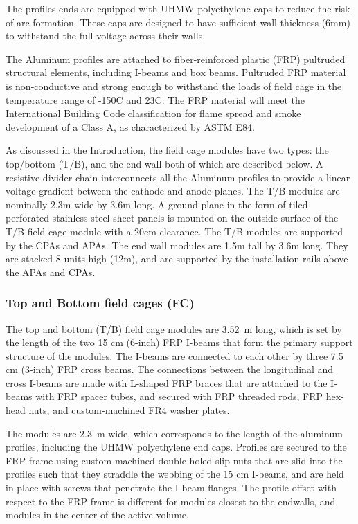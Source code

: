 The profiles ends are equipped with UHMW polyethylene caps to reduce the risk of arc formation.  These caps are designed to have sufficient wall thickness (6mm) to withstand the full voltage across their walls.

The Aluminum profiles are attached to fiber-reinforced plastic (FRP) pultruded structural elements, including I-beams and box beams.  
Pultruded FRP material is non-conductive and strong enough to withstand the loads of field cage in the temperature range of -150C and 23C.
The FRP material will meet the International Building Code classification for flame spread and smoke development of a Class A, as characterized by ASTM E84.  


As discussed in the Introduction, the field cage modules have two types: the top/bottom (T/B), and the end wall both of which are described below. 
A resistive divider chain interconnects all the Aluminum profiles to provide a linear voltage gradient between the cathode and anode planes.  The T/B modules are nominally 2.3m wide by 3.6m long. A ground plane in the form of tiled perforated stainless steel sheet panels is mounted on the outside surface of the T/B field cage module with a 20cm clearance. The T/B modules are supported by the CPAs and APAs. The end wall modules are 1.5m tall by 3.6m long. They are stacked 8 units high (12m), and are supported by the installation rails above the APAs and CPAs.



\subsubsection{Top and Bottom field cages (FC)}

The top and bottom (T/B) field cage modules are 3.52~m long, which is set by the length of the two 15 cm (6-inch) FRP I-beams that form the primary support structure of the modules. The I-beams are connected to each other by three  7.5 cm (3-inch) FRP cross beams. The connections between the longitudinal and cross I-beams are made with L-shaped FRP braces that are attached to the I-beams with FRP spacer tubes, and secured with FRP threaded rods, FRP hex-head nuts, and custom-machined FR4 washer plates.

The modules are 2.3~m wide, which corresponds to the length of the aluminum profiles, including the UHMW polyethylene end caps. Profiles are secured to the FRP frame using custom-machined double-holed slip nuts that are slid into the profiles such that they straddle the webbing of the 15 cm I-beams, and are held in place with screws that penetrate the I-beam flanges. The profile offset with respect to the FRP frame is different for modules closest to the endwalls, and modules in the center of the active volume.

